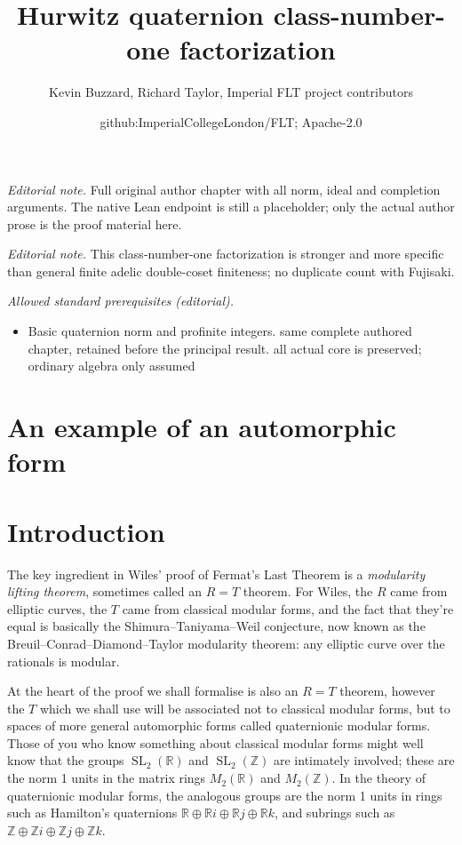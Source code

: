 \documentclass[10pt,a4paper]{article}
\title{Hurwitz quaternion class-number-one factorization}
\author{Kevin Buzzard, Richard Taylor, Imperial FLT project contributors}
\date{github:ImperialCollegeLondon/FLT; Apache-2.0}
\newcommand{\Z}{\mathbb{Z}}
\newcommand{\R}{\mathbb{R}}
\DeclareMathOperator{\SL}{SL}
\newcounter{chapter}
\newcommand{\chapter}[1]{\section*{#1}}
\begin{document}
\maketitle
\noindent\textit{Editorial note.} Full original author chapter with all norm, ideal and completion arguments. The native Lean endpoint is still a placeholder; only the actual author prose is the proof material here.\par\medskip
\noindent\textit{Editorial note.} This class-number-one factorization is stronger and more specific than general finite adelic double-coset finiteness; no duplicate count with Fujisaki.\par\medskip
\noindent\textit{Allowed standard prerequisites (editorial).}\begin{itemize}
\item Basic quaternion norm and profinite integers. same complete authored chapter, retained before the principal result. all actual core is preserved; ordinary algebra only assumed
\end{itemize}\medskip
\chapter{An example of an automorphic form}

\section{Introduction}

The key ingredient in Wiles' proof of Fermat's Last Theorem is a \emph{modularity lifting theorem},
sometimes called an $R=T$ theorem. For Wiles, the $R$ came from elliptic curves, the $T$ came from
classical modular forms, and the fact that they're equal is basically the Shimura--Taniyama--Weil
conjecture, now known as the Breuil--Conrad--Diamond--Taylor modularity theorem: any elliptic
curve over the rationals is modular.

At the heart of the proof we shall formalise is also an $R=T$ theorem, however the $T$ which we
shall use will be associated not to classical modular forms, but to spaces of more general
automorphic forms called quaternionic modular forms. Those of you who know something about
classical modular forms might well know that the groups $\SL_2(\R)$ and $\SL_2(\Z)$ are
intimately involved; these are the norm 1 units in the matrix rings $M_2(\R)$ and $M_2(\Z)$.
In the theory of quaternionic modular forms, the analogous groups are the norm 1 units
in rings such as Hamilton's quaternions $\R\oplus\R i\oplus\R j\oplus\R k$, and subrings
such as $\Z\oplus\Z i\oplus\Z j\oplus\Z k$.
\end{document}

